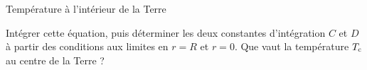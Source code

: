 \begin{exo}[PSI][2][TD]{Température à l'intérieur de la Terre}
\begin{quest}
\item Intégrer cette équation, puis déterminer les deux constantes d'intégration $C$ et $D$ à partir des conditions aux limites en $r=R$ et $r=0$. Que vaut la température $T_{\rm c}$ au centre de la Terre ?



%
%
%
%

\end{quest}
\end{exo}
